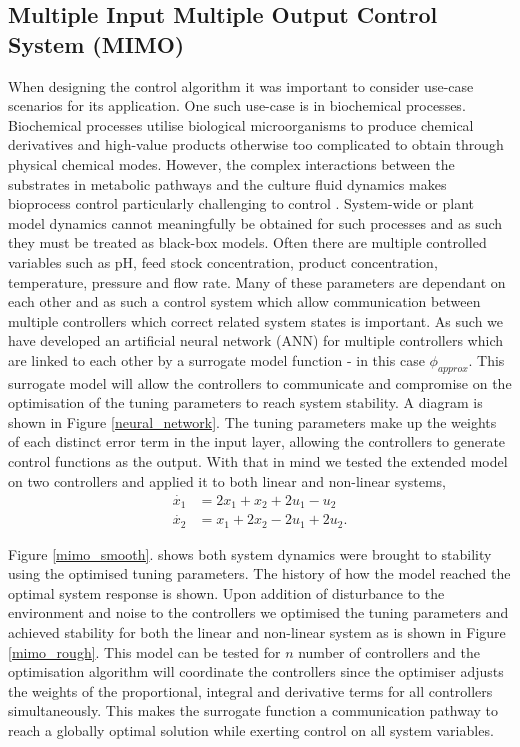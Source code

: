 \documentclass[conference]{IEEEtran}
\theoremstyle{definition}
\begin{document}
\subsection{Multiple Input Multiple Output Control System (MIMO)}
\noindent When designing the control algorithm it was important to consider use-case scenarios for its application. One such use-case is in biochemical processes. Biochemical processes utilise biological microorganisms to produce chemical derivatives and high-value products otherwise too complicated to obtain through physical chemical modes. However, the complex interactions between the substrates in metabolic pathways and the culture fluid dynamics makes bioprocess control particularly challenging to control \cite{Rio}. System-wide or plant model dynamics cannot meaningfully be obtained for such processes and as such they must be treated as black-box models. Often there are multiple controlled variables such as pH, feed stock concentration, product concentration, temperature, pressure and flow rate. Many of these parameters are dependant on each other and as such a control system which allow communication between multiple controllers which correct related system states is important. As such we have developed an artificial neural network (ANN) for multiple controllers which are linked to each other by a surrogate model function - in this case $\phi_{approx}$. This surrogate model will allow the controllers to communicate and compromise on the optimisation of the tuning parameters to reach system stability. A diagram is shown in Figure \ref{neural_network}. The tuning parameters make up the weights of each distinct error term in the input layer, allowing the controllers to generate control functions as the output. With that in mind we tested the extended model on two controllers and applied it to both linear and non-linear systems,
\begin{align}
    \dot{x_1} &= 2x_1 + x_2 + 2u_1 - u_2 \\
    \dot{x_2} &= x_1 + 2x_2 - 2u_1 + 2u_2.
\end{align}

\noindent Figure \ref{mimo_smooth}. shows both system dynamics were brought to stability using the optimised tuning parameters. The history of how the model reached the optimal system response is shown. Upon addition of disturbance to the environment and noise to the controllers we optimised the tuning parameters and achieved stability for both the linear and non-linear system as is shown in Figure \ref{mimo_rough}. This model can be tested for $n$ number of controllers and the optimisation algorithm will coordinate the controllers since the optimiser adjusts the weights of the proportional, integral and derivative terms for all controllers simultaneously. This makes the surrogate function a communication pathway to reach a globally optimal solution while exerting control on all system variables.
\end{document}
